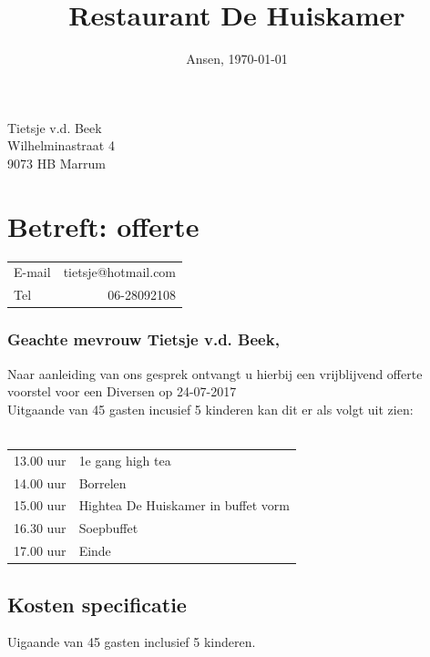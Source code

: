 \documentclass{scrartcl}
\begin{document}

\title{Restaurant De Huiskamer}
\date{Ansen, \today}
\maketitle
\thispagestyle{empty}

\begin{flushright}
	Tietsje v.d. Beek \\
	Wilhelminastraat 4 \\
	9073 HB Marrum
\end{flushright}
\section{Betreft: offerte}
\begin{tabular}{l r}
  E-mail & tietsje@hotmail.com  \\
  Tel & 06-28092108  \\
\end{tabular}

\subsubsection*{Geachte mevrouw
 Tietsje v.d. Beek,}

Naar aanleiding van ons gesprek ontvangt u hierbij een vrijblijvend offerte voorstel
voor een Diversen
 op 24-07-2017 \\

Uitgaande van 45 gasten incusief 5 kinderen kan dit er als volgt uit zien: \\\\
\begin{tabular}{ll} 
13.00 uur & 1e gang high tea \\
14.00 uur &  Borrelen \\
15.00 uur & Hightea De Huiskamer in buffet vorm \\
16.30 uur & Soepbuffet\\
17.00 uur & Einde \\

 \end{tabular} 


\newpage

\subsection*{Kosten specificatie}
Uigaande van 45 gasten inclusief 5 kinderen.
\end{document}
